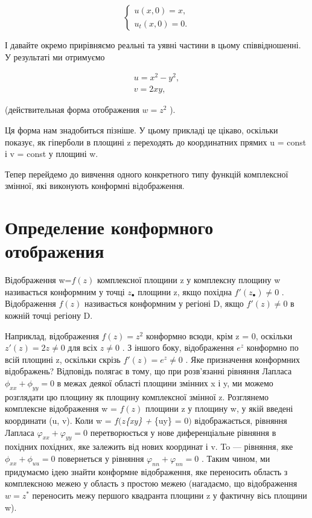 \documentclass[
  ukrainian,
]{article}
\begin{document}
\[
\begin{cases} u(x, 0) = x, \\ u_t(x, 0) = 0. \end{cases}
\]

І давайте окремо прирівняємо реальні та уявні частини в цьому
співвідношенні. У результаті ми отримуємо

\[
\begin{array}{ll} u=x^2-y^2,\\ v=2xy, \end{array}
\]

(действительная форма отображения \(w=z^2\) ).

Ця форма нам знадобиться пізніше. У цьому прикладі це цікаво, оскільки
показує, як гіперболи в площині z переходять до координатних прямих u =
const і v = const у площині w.

Тепер перейдемо до вивчення одного конкретного типу функцій комплексної
змінної, які виконують конформні відображення.

\section{Определение конформного
отображения}\label{ux43eux43fux440ux435ux434ux435ux43bux435ux43dux438ux435-ux43aux43eux43dux444ux43eux440ux43cux43dux43eux433ux43e-ux43eux442ux43eux431ux440ux430ux436ux435ux43dux438ux44f}

Відображення w=\(f(z)\) комплексної площини z у комплексну площину w
називається конформним у точці \(z_{\bullet}\) площини z, якщо похідна
\(f'(z_{\bullet}) \neq 0\) . Відображення \(f(z)\) називається
конформним у регіоні D, якщо \(f'(z) \neq 0\) в кожній точці регіону D.

Наприклад, відображення \(f(z) = z^2\) конформно всюди, крім z = 0,
оскільки \(z'(z) = 2z \neq 0\) для всіх \(z \neq 0\) . З іншого боку,
відображення \(e^z\) конформно по всій площині z, оскільки скрізь
\(f'(z) = e^z \neq 0\) . Яке призначення конформних відображень?
Відповідь полягає в тому, що при розв'язанні рівняння Лапласа
\(\phi_{xx} + \phi_{yy} = 0\) в межах деякої області площини змінних x і
y, ми можемо розглядати цю площину як площину комплексної змінної z.
Розглянемо комплексне відображення w = \(f(z)\) площини z у площину w, у
якій введені координати (u, v). Коли w = \(f(z\)\phi\emph{\{xy\} +
\phi}\{uy\} = 0\()\) відображається, рівняння Лапласа
\(\varphi_{xx} + \varphi_{yy} = 0\) перетворюється у нове диференціальне
рівняння в похідних похідних, яке залежить від нових координат і v. To
--- рівняння, яке \(\phi_{xx} + \phi_{uu} = 0\) повернеться у рівняння
\(\varphi_{nn} + \varphi_{nn} = 0\) . Таким чином, ми придумаємо ідею
знайти конформне відображення, яке переносить область з комплексною
межею у область з простою межею (нагадаємо, що відображення \(w=z^*\)
переносить межу першого квадранта площини z у фактичну вісь площини w).
\end{document}
